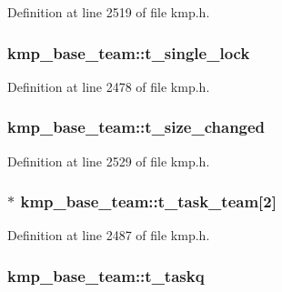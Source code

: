 Definition at line 2519 of file kmp.\-h.

\hypertarget{structkmp__base__team_abecb95e75ade6626a1ae3126d775cdaf}{
\subsubsection[{t\-\_\-single\-\_\-lock}]{ kmp\-\_\-base\-\_\-team\-::t\-\_\-single\-\_\-lock}}\label{structkmp__base__team_abecb95e75ade6626a1ae3126d775cdaf}


Definition at line 2478 of file kmp.\-h.

\hypertarget{structkmp__base__team_a0716c6d76606cb98d7dff2e8ddde5ff1}{
\subsubsection[{t\-\_\-size\-\_\-changed}]{ kmp\-\_\-base\-\_\-team\-::t\-\_\-size\-\_\-changed}}\label{structkmp__base__team_a0716c6d76606cb98d7dff2e8ddde5ff1}


Definition at line 2529 of file kmp.\-h.

\hypertarget{structkmp__base__team_a46a00f88fcd8f41d394023df0d5f354b}{
\subsubsection[{t\-\_\-task\-\_\-team}]{$\ast$ kmp\-\_\-base\-\_\-team\-::t\-\_\-task\-\_\-team\mbox{[}2\mbox{]}}}\label{structkmp__base__team_a46a00f88fcd8f41d394023df0d5f354b}


Definition at line 2487 of file kmp.\-h.

\hypertarget{structkmp__base__team_a29f00e7a761ee51520f34dd941bba0da}{
\subsubsection[{t\-\_\-taskq}]{ kmp\-\_\-base\-\_\-team\-::t\-\_\-taskq}}\label{structkmp__base__team_a29f00e7a761ee51520f34dd941bba0da}


